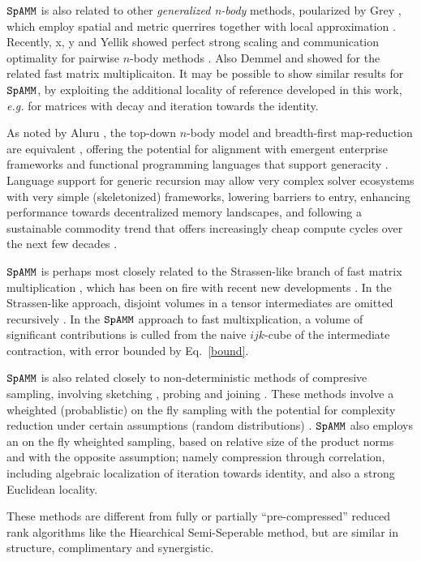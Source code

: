 \documentclass[letterpaper,twocolumn,amsmath,amsfont,amssymb,english,aps,jcp,preprintnumbers,groupaddress,nofootinbib,tightenlines]{revtex4}
\begin{document}
$\tt SpAMM$ is also related to other {\em generalized n-body} methods, poularized by Grey \cite{}, which employ spatial and 
metric querrires \cite{Sammet} together with local approximation \cite{}.  
Recently, x, y  and Yellik showed perfect strong scaling and communication optimality 
for pairwise $n$-body methods \cite{Warren Salmon, Yellik}.  Also Demmel and showed  for the related fast matrix multiplicaiton.
It may be possible to show similar results 
for $\tt SpAMM$, by exploiting the additional locality of reference developed in this work, 
{\em e.g.} for matrices with decay and iteration towards the identity.  

As noted by Aluru \cite{}, the top-down $n$-body model and breadth-first map-reduction are equivalent \cite{}, offering
the potential for alignment with emergent enterprise frameworks \cite{} and functional programming 
languages that support generacity \cite{}. Language support for generic recursion may allow very complex solver ecosystems 
with very simple (skeletonized) frameworks, lowering barriers to entry, enhancing performance towards decentralized memory landscapes, 
and following a sustainable commodity trend \cite{softwaresustainanbilty} that offers 
increasingly cheap compute cycles over the next few decades \cite{}. 

$\tt SpAMM$ is perhaps most closely related to the Strassen-like branch of fast matrix multiplication \cite{},  
which has been on fire with recent new developments \cite{}.  In the Strassen-like approach, disjoint volumes in a tensor 
intermediates are omitted recursively \cite{}.  In the $\tt SpAMM$ approach to fast multixplication, a volume of
significant contributions is culled from the naive $ijk$-cube of the intermediate contraction, 
with error bounded by Eq.~\ref{bound}.  

$\tt SpAMM$ is also related closely to non-deterministic methods of compresive sampling,  involving 
sketching \cite{Kutzkov2012, Pagh2013}, probing \cite{} and joining \cite{}.  These methods involve
a wheighted (probablistic)  on the fly sampling with the potential for complexity reduction under
certain assumptions (random distributions) \cite{}.  
$\tt SpAMM$ also employs an on the fly wheighted sampling, based on relative size of the product norms and with the opposite 
assumption; namely compression through correlation, including algebraic localization of iteration towards  
identity, and also a strong Euclidean locality. 


These methods are different from 
fully or partially ``pre-compressed'' reduced rank algorithms \cite{} like the Hiearchical Semi-Seperable method, 
but are similar in structure, complimentary and synergistic. 
\end{document}
